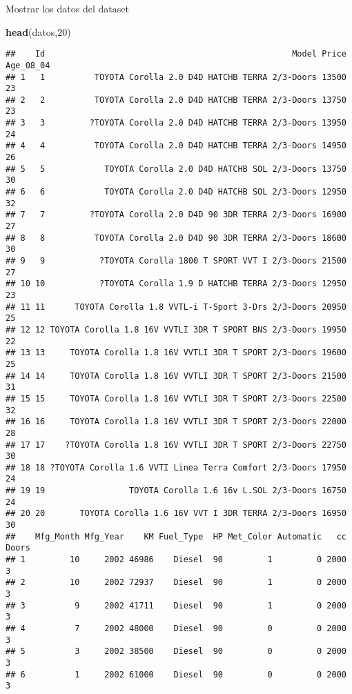 \documentclass[
]{article}
\newenvironment{Shaded}{\begin{snugshade}}{\end{snugshade}}
\newcommand{\DecValTok}[1]{\textcolor[rgb]{0.00,0.00,0.81}{#1}}
\newcommand{\KeywordTok}[1]{\textcolor[rgb]{0.13,0.29,0.53}{\textbf{#1}}}
\newcommand{\NormalTok}[1]{#1}
\begin{document}
Mostrar los datos del dataset

\begin{Shaded}
\begin{Highlighting}[]
\KeywordTok{head}\NormalTok{(datos,}\DecValTok{20}\NormalTok{)}
\end{Highlighting}
\end{Shaded}

\begin{verbatim}
##    Id                                                  Model Price Age_08_04
## 1   1          TOYOTA Corolla 2.0 D4D HATCHB TERRA 2/3-Doors 13500        23
## 2   2          TOYOTA Corolla 2.0 D4D HATCHB TERRA 2/3-Doors 13750        23
## 3   3         ?TOYOTA Corolla 2.0 D4D HATCHB TERRA 2/3-Doors 13950        24
## 4   4          TOYOTA Corolla 2.0 D4D HATCHB TERRA 2/3-Doors 14950        26
## 5   5            TOYOTA Corolla 2.0 D4D HATCHB SOL 2/3-Doors 13750        30
## 6   6            TOYOTA Corolla 2.0 D4D HATCHB SOL 2/3-Doors 12950        32
## 7   7         ?TOYOTA Corolla 2.0 D4D 90 3DR TERRA 2/3-Doors 16900        27
## 8   8          TOYOTA Corolla 2.0 D4D 90 3DR TERRA 2/3-Doors 18600        30
## 9   9           ?TOYOTA Corolla 1800 T SPORT VVT I 2/3-Doors 21500        27
## 10 10           ?TOYOTA Corolla 1.9 D HATCHB TERRA 2/3-Doors 12950        23
## 11 11      TOYOTA Corolla 1.8 VVTL-i T-Sport 3-Drs 2/3-Doors 20950        25
## 12 12 TOYOTA Corolla 1.8 16V VVTLI 3DR T SPORT BNS 2/3-Doors 19950        22
## 13 13     TOYOTA Corolla 1.8 16V VVTLI 3DR T SPORT 2/3-Doors 19600        25
## 14 14     TOYOTA Corolla 1.8 16V VVTLI 3DR T SPORT 2/3-Doors 21500        31
## 15 15     TOYOTA Corolla 1.8 16V VVTLI 3DR T SPORT 2/3-Doors 22500        32
## 16 16     TOYOTA Corolla 1.8 16V VVTLI 3DR T SPORT 2/3-Doors 22000        28
## 17 17    ?TOYOTA Corolla 1.8 16V VVTLI 3DR T SPORT 2/3-Doors 22750        30
## 18 18 ?TOYOTA Corolla 1.6 VVTI Linea Terra Comfort 2/3-Doors 17950        24
## 19 19                 TOYOTA Corolla 1.6 16v L.SOL 2/3-Doors 16750        24
## 20 20       TOYOTA Corolla 1.6 16V VVT I 3DR TERRA 2/3-Doors 16950        30
##    Mfg_Month Mfg_Year    KM Fuel_Type  HP Met_Color Automatic   cc Doors
## 1         10     2002 46986    Diesel  90         1         0 2000     3
## 2         10     2002 72937    Diesel  90         1         0 2000     3
## 3          9     2002 41711    Diesel  90         1         0 2000     3
## 4          7     2002 48000    Diesel  90         0         0 2000     3
## 5          3     2002 38500    Diesel  90         0         0 2000     3
## 6          1     2002 61000    Diesel  90         0         0 2000     3

\end{verbatim}
\end{document}
